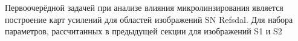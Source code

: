 Первоочерёдной задачей при анализе влияния микролинзирования является построение карт усилений для областей изображений SN Refsdal. Для набора параметров, рассчитанных в предыдущей секции для изображений S1 и S2 


